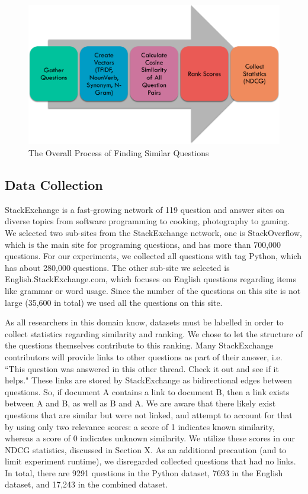 \documentclass{acm_proc_article-sp}
\begin{document}
\begin{figure}[h]
\centering
\includegraphics[width=1\columnwidth]{images/overall_structure.pdf}
\caption{The Overall Process of  Finding Similar Questions}
\label{fig:structure}
\end{figure}


\subsection{Data Collection}
StackExchange is a fast-growing network of 119 question and answer sites on diverse topics from software programming to cooking, photography to gaming. We selected two sub-sites from the StackExchange network, one is StackOverflow, which is the main site for programing questions, and has more than 700,000 questions. For our experiments, we collected all questions with tag Python, which has about 280,000 questions. The other sub-site we selected is English.StackExchange.com, which focuses on English questions regarding items like grammar or word usage. Since the number of the questions on this site is not large (35,600 in total) we used all the questions on this site.  

As all researchers in this domain know, datasets must be labelled in order to collect statistics regarding similarity and ranking. We chose to let the structure of the questions themselves contribute to this ranking. Many StackExchange contributors will provide links to other questions as part of their answer, i.e. ``This question was answered in this other thread. Check it out and see if it helps." These links are stored by StackExchange as bidirectional edges between questions. So, if document A contains a link to document B, then a link exists between A and B, as well as B and A. We are aware that there likely exist questions that are similar but were not linked, and attempt to account for that by using only two relevance scores: a score of 1 indicates known similarity, whereas a score of 0 indicates unknown similarity. We utilize these scores in our NDCG statistics, discussed in Section X. As an additional precaution (and to limit experiment runtime), we disregarded collected questions that had no links. In total, there are 9291 questions in the Python dataset, 7693 in the English dataset, and 17,243 in the combined dataset. 
\end{document}
